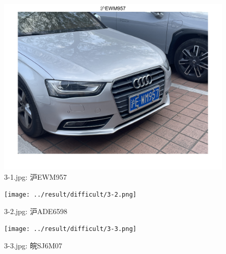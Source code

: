 \documentclass[utf8,a4paper]{ctexart}
\begin{document}
\begin{appendices}
    \begin{minipage}{0.44\linewidth}
        \begin{figure}[H]
            \center
            \includegraphics[width=\linewidth]{../result/difficult/3-1.png}
            \caption{3-1.jpg: 沪EWM957}
        \end{figure}
    \end{minipage}
    \hfill
    \begin{minipage}{0.44\linewidth}
        \begin{figure}[H]
            \center
            \texttt{[image: ../result/difficult/3-2.png]}
            \caption{3-2.jpg: 沪ADE6598}
        \end{figure}
    \end{minipage}
    \par
    \begin{minipage}{0.44\linewidth}
        \begin{figure}[H]
            \center
            \texttt{[image: ../result/difficult/3-3.png]}
            \caption{3-3.jpg: 皖SJ6M07} 
        \end{figure}
    \end{minipage}
    \hfill
    \begin{minipage}{0.44\linewidth}
        
    \end{minipage}
    \par


\end{appendices}
\end{document}
